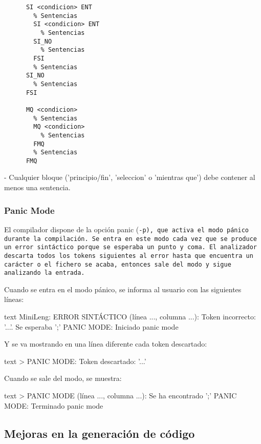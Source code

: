 \documentclass[../main.tex]{subfiles}
\begin{document}
  \begin{verbatim}
      SI <condicion> ENT
        % Sentencias
        SI <condicion> ENT
          % Sentencias
        SI_NO
          % Sentencias
        FSI
        % Sentencias
      SI_NO
        % Sentencias
      FSI

      MQ <condicion>
        % Sentencias
        MQ <condicion>
          % Sentencias
        FMQ
        % Sentencias
      FMQ
  \end{verbatim}

  - Cualquier bloque ('principio/fin', 'seleccion' o 'mientras que') debe contener al menos una
    sentencia.




\subsubsection{Panic Mode}
El compilador dispone de la opción panic (\tt{-p}), que activa el modo pánico durante la compilación. Se entra en este modo cada vez que se produce un error sintáctico porque se esperaba un punto y coma. El analizador descarta todos los tokens siguientes al error hasta que encuentra un carácter \car{;} o el fichero se acaba, entonces sale del modo y sigue analizando la entrada.

Cuando se entra en el modo pánico, se informa al usuario con las siguientes líneas:

\begin{codigo}{text}
MiniLeng: ERROR SINTÁCTICO (línea ..., columna ...): Token incorrecto: '...'. Se esperaba ';'
PANIC MODE: Iniciado panic mode
\end{codigo}

Y se va mostrando en una línea diferente cada token descartado:

\begin{codigo}{text}
> PANIC MODE: Token descartado: '...'
\end{codigo}

Cuando se sale del modo, se muestra:

\begin{codigo}{text}
  > PANIC MODE (línea ..., columna ...): Se ha encontrado ';'
PANIC MODE: Terminado panic mode
\end{codigo}

\subsection{Mejoras en la generación de código}
\end{document}
